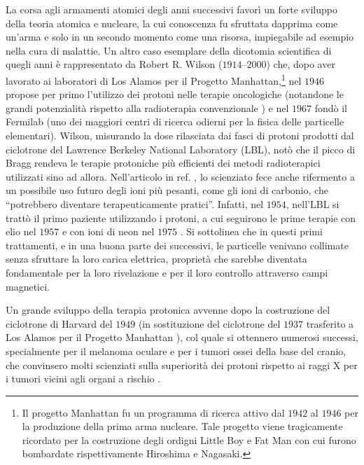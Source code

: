 \documentclass[12pt,a4paper,twoside]{report}
\begin{document}
	La corsa agli armamenti atomici degli anni successivi favorì un forte sviluppo della teoria atomica e nucleare, la cui conoscenza fu sfruttata dapprima come un'arma e solo in un secondo momento come una risorsa, impiegabile ad esempio nella cura di malattie. Un altro caso esemplare della dicotomia scientifica di quegli anni è rappresentato da Robert R. Wilson ($1914$--$2000$) che, dopo aver lavorato ai laboratori di Los Alamos per il Progetto Manhattan,\footnote{Il progetto Manhattan fu un programma di ricerca attivo dal $1942$ al $1946$ per la produzione della prima arma nucleare. Tale progetto viene tragicamente ricordato per la costruzione degli ordigni Little Boy e Fat Man con cui furono bombardate rispettivamente Hiroshima e Nagasaki.} nel $1946$ propose per primo l'utilizzo dei protoni nelle terapie oncologiche (notandone le grandi potenzialità rispetto alla radioterapia convenzionale \cite{Wilson1946-uk}) e nel $1967$ fondò il Fermilab (uno dei maggiori centri di ricerca odierni per la fisica delle particelle elementari). Wilson, misurando la dose rilasciata dai fasci di protoni prodotti dal ciclotrone del Lawrence Berkeley National Laboratory (LBL), notò che il picco di Bragg rendeva le terapie protoniche più efficienti dei metodi radioterapici utilizzati sino ad allora. Nell'articolo in ref. \cite{Wilson1946-uk}, lo scienziato fece anche rifermento a un possibile uso futuro degli ioni più pesanti, come gli ioni di carbonio, che ``potrebbero diventare terapeuticamente pratici''. Infatti, nel $1954$, nell'LBL si trattò il primo paziente utilizzando i protoni, a cui seguirono le prime terapie con elio nel $1957$ e con ioni di neon nel $1975$ \cite{amaldi_article}. Si sottolinea che in questi primi trattamenti, e in una buona parte dei successivi, le particelle venivano collimate senza sfruttare la loro carica elettrica, proprietà che sarebbe diventata fondamentale per la loro rivelazione e per il loro controllo attraverso campi magnetici.
	
	Un grande sviluppo della terapia protonica avvenne dopo la costruzione del ciclotrone di Harvard del $1949$ (in sostituzione del ciclotrone del $1937$ trasferito a Los Alamos per il Progetto Manhattan \cite{cerncourier}), col quale si ottennero numerosi successi, specialmente per il melanoma oculare e per i tumori ossei della base del cranio, che convinsero molti scienziati sulla superiorità dei protoni rispetto ai raggi X per i tumori vicini agli organi a rischio \cite{Wilson2004-tc}.
	
\end{document}
